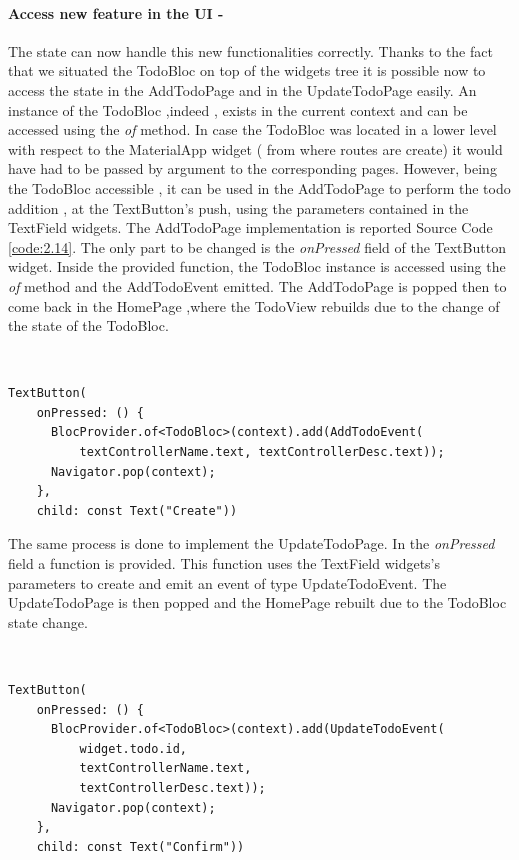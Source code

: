 \paragraph{Access new feature in the UI - }\label{subpar:todo_app_bloc_core_state}

The state can now handle this new functionalities correctly. Thanks to the fact that we situated the TodoBloc on top of the widgets tree it is possible now to access the state in the AddTodoPage and in the UpdateTodoPage easily. An instance of the TodoBloc ,indeed , exists in the current context and can be accessed using the \textit{of} method. In case the TodoBloc was located in a lower level with respect to the MaterialApp widget ( from where routes are create)  it would have had to be passed by argument to the corresponding pages. However, being the TodoBloc accessible , it can be used in the AddTodoPage to perform the todo addition , at the TextButton’s push, using the parameters contained in the TextField widgets. The AddTodoPage implementation is reported Source Code \ref{code:2.14}. The only part to be changed is the \textit{onPressed} field of the TextButton widget. Inside the provided function, the TodoBloc instance is accessed using the \textit{of} method and the AddTodoEvent emitted. The AddTodoPage is popped then to come back in the HomePage ,where the TodoView rebuilds due to the change of the state of the TodoBloc.
\begin{code}
\mbox{}\\
 \mbox{}
\label{code:2.14}
\begin{verbatim}
TextButton(
    onPressed: () {
      BlocProvider.of<TodoBloc>(context).add(AddTodoEvent(
          textControllerName.text, textControllerDesc.text));
      Navigator.pop(context);
    },
    child: const Text("Create"))
\end{verbatim}
\mbox{}
\end{code}

The same process is done to implement the UpdateTodoPage. In the \textit{onPressed} field a function is provided. This function uses the TextField widgets’s parameters to create and emit an event of type UpdateTodoEvent. The UpdateTodoPage is then popped and the HomePage rebuilt due to the TodoBloc state change.
\begin{code}
\mbox{}\\
 \mbox{}
\label{code:2.14}
\begin{verbatim}
TextButton(
    onPressed: () {
      BlocProvider.of<TodoBloc>(context).add(UpdateTodoEvent(
          widget.todo.id,
          textControllerName.text,
          textControllerDesc.text));
      Navigator.pop(context);
    },
    child: const Text("Confirm"))
\end{verbatim}
\mbox{}
\end{code}

